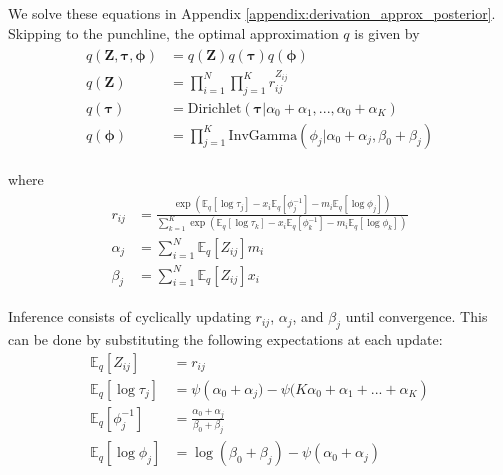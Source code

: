 \documentclass{article}
\let\vec\boldsymbol
\begin{document}
We solve these equations in Appendix \ref{appendix:derivation_approx_posterior}.
Skipping to the punchline, the optimal approximation $q$ is given by
\begin{align}\begin{split}
    q \left( \vec{Z}, \boldsymbol{\tau}, \boldsymbol{\phi} \right) &= q \left( \vec{Z} \right) q \left( \boldsymbol{\tau} \right) q \left( \boldsymbol{\phi} \right) \\
    q \left( \vec{Z} \right) &= \prod\limits_{i=1}^{N} \prod\limits_{j=1}^{K} r_{ij}^{Z_{ij}} \\
    q \left( \boldsymbol{\tau} \right) &= \text{Dirichlet} \left(
        \boldsymbol{\tau} | \alpha_{0} + \alpha_{1}, ..., \alpha_{0} + \alpha_{K}
    \right) \\
    q \left( \boldsymbol{\phi} \right) &= \prod\limits_{j=1}^{K} \text{InvGamma} \left(
        \phi_{j} | \alpha_{0} + \alpha_{j}, \beta_{0} + \beta_{j}
    \right)
\end{split}\end{align}

where
\begin{align}\begin{split}
    r_{ij} &= \frac{
        \exp \left(
            \mathbb{E}_{q} \left[ \log \tau_{j} \right] - x_{i} \mathbb{E}_{q} \left[ \phi_{j}^{-1} \right] - m_{i} \mathbb{E}_{q} \left[ \log \phi_{j} \right]
        \right)
    }{
        \sum\limits_{k=1}^{K} \exp \left(
            \mathbb{E}_{q} \left[ \log \tau_{k} \right] - x_{i} \mathbb{E}_{q} \left[ \phi_{k}^{-1} \right] - m_{i} \mathbb{E}_{q} \left[ \log \phi_{k} \right]
        \right)
    } \\
    \alpha_{j} &= \sum\limits_{i=1}^{N} \mathbb{E}_{q} \left[ Z_{ij} \right] m_{i} \\
    \beta_{j} &= \sum\limits_{i=1}^{N} \mathbb{E}_{q} \left[ Z_{ij} \right] x_{i}
\end{split}\end{align}

Inference consists of cyclically updating $r_{ij}$, $\alpha_{j}$, and $\beta_{j}$
until convergence. This can be done by substituting the following expectations at each update:
\begin{align*}
    \mathbb{E}_{q} \left[ Z_{ij} \right] &= r_{ij} \\
    \mathbb{E}_{q} \left[ \log \tau_{j} \right] &= \psi \left( \alpha_{0} + \alpha_{j}) - \psi (K \alpha_{0} + \alpha_{1} + ... + \alpha_{K} \right) \\
    \mathbb{E}_{q} \left[ \phi_{j}^{-1} \right] &= \frac{\alpha_{0} + \alpha_{j}}{\beta_{0} + \beta_{j}} \\
    \mathbb{E}_{q} \left[ \log \phi_{j} \right] &= \log (\beta_{0} + \beta_{j}) - \psi (\alpha_{0} + \alpha_{j})
\end{align*}
\end{document}

